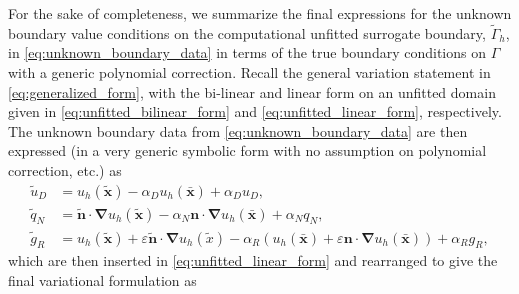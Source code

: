 \documentclass{article}
\begin{document}
For the sake of completeness, we summarize the final expressions for the unknown boundary value conditions on the computational unfitted surrogate boundary, $\tilde{\Gamma}_h$, in \eqref{eq:unknown_boundary_data} in terms of the true boundary conditions on $\Gamma$ with a generic polynomial correction. Recall the general variation statement in \eqref{eq:generalized_form}, with the bi-linear and linear form on an unfitted domain given in \eqref{eq:unfitted_bilinear_form} and \eqref{eq:unfitted_linear_form}, respectively. The unknown boundary data from \eqref{eq:unknown_boundary_data} are then expressed (in a very generic symbolic form with no assumption on polynomial correction, etc.) as
\begin{subequations}\label{eq:known_boundary_data}
\begin{align}
    \tilde{u}_D    &= u_h(\tilde{\boldsymbol{x}}) -  \alpha_D u_h(\bar{\boldsymbol{x}}) + \alpha_D u_D,\\
    \tilde{q}_N    &= \tilde{\boldsymbol{n}}\cdot \boldsymbol{\nabla} u_h(\tilde{\boldsymbol{x}}) - \alpha_N \boldsymbol{n}\cdot \boldsymbol{\nabla} u_h(\bar{\boldsymbol{x}}) + \alpha_N q_N,  \\
    \tilde{g}_{R} &= u_h(\tilde{\boldsymbol{x}}) + \varepsilon \tilde{\boldsymbol{n}}\cdot \boldsymbol{\nabla} u_h(\tilde{x}) - \alpha_R(u_h(\bar{\boldsymbol{x}}) +  \varepsilon \boldsymbol{n}\cdot \boldsymbol{\nabla} u_h(\bar{\boldsymbol{x}})) + \alpha_R g_R,
\end{align}
\end{subequations}
which are then inserted in \eqref{eq:unfitted_linear_form} and rearranged to give the final variational formulation as
\end{document}
